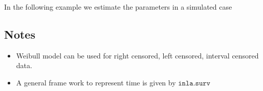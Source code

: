 \documentclass[a4paper,11pt]{article}
\begin{document}
In the following example we estimate the parameters in a simulated
case 


\subsection*{Notes}

\begin{itemize}
\item Weibull model can be used for right censored, left censored, interval censored data.
\item A general frame work to represent time is given by $\texttt{inla.surv}$  
\end{itemize}
\end{document}

